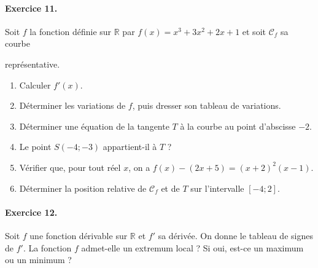 \documentclass[11pt]{article}
\begin{document}
\paragraph{Exercice 11.} Soit $f$ la fonction définie sur $\mathbb{R}$ par
$f(x)=x^3+3x^2+2x+1$ et soit $\mathscr C_f$ sa courbe\\[1mm]
\begin{minipage}{.75\textwidth}
représentative.
\begin{enumerate}
  \item Calculer $f'(x)$.
  \item Déterminer les variations de $f$, puis dresser son tableau de variations.
  \item Déterminer une équation de la tangente $T$ à la courbe au point
    d'abscisse $-2$.
  \item Le point $S(-4;-3)$ appartient-il à $T$ ?
  \item Vérifier que, pour tout réel $x$, on a $f(x)-(2x+5)=(x+2)^2(x-1)$.
  \item Déterminer la position relative de $\mathscr C_f$ et de $T$ sur
    l'intervalle $[-4;2]$.
\end{enumerate}
\end{minipage}
\begin{minipage}{.25\textwidth}
  \begin{center}
  \end{center}
\end{minipage}

\paragraph{Exercice 12.}
Soit $f$ une fonction dérivable sur $\mathbb{R}$ et $f'$ sa dérivée. On donne le
tableau de signes de $f'$. La fonction $f$ admet-elle un extremum local ? Si
oui, est-ce un maximum ou un minimum ?
\begin{center}
\end{center}
\end{document}
